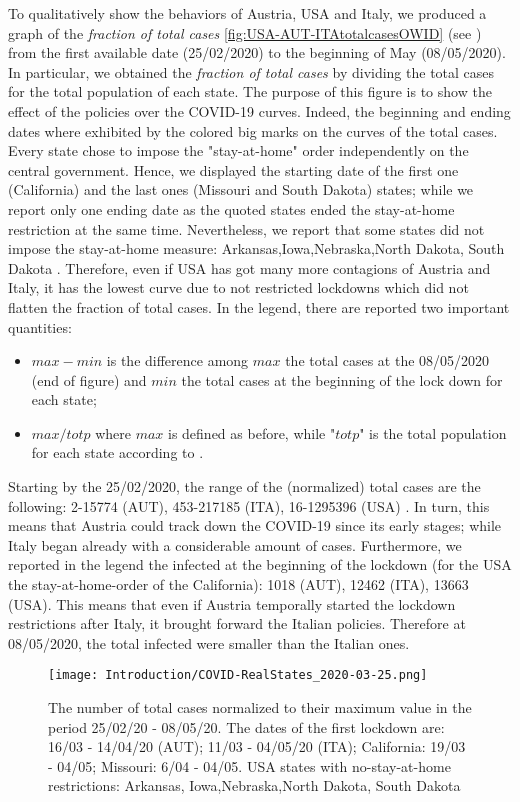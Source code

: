 \documentclass[a4paper,10pt]{book} %
\theoremstyle{definition}
\begin{document}
To qualitatively show the behaviors of Austria, USA and Italy, we produced a graph of the \textit{fraction of total cases}  \autoref{fig:USA-AUT-ITAtotalcasesOWID} (see \cite{JHUGitHub:2020_TotalCases}) from the first available date (25/02/2020) to the beginning of May (08/05/2020). In particular, we obtained the \textit{fraction of total cases} by dividing the total cases for the total population of each state.
The purpose of this figure is to show the effect of the policies over the COVID-19 curves.
Indeed, the beginning and ending dates where exhibited by the colored big marks on the curves of the total cases. Every state chose to impose the "stay-at-home" order independently on the central government. Hence, we displayed the starting date of the first one (California) and the last ones (Missouri and South Dakota) states; while we report only one ending date as the quoted states ended the stay-at-home restriction at the same time. Nevertheless, we report that some states did not impose the stay-at-home measure: Arkansas,Iowa,Nebraska,North Dakota,	South Dakota \cite{NBC_USA:2020_InitalDates}.
Therefore, even if USA has got many more contagions of Austria and Italy, it has the lowest curve due to not restricted lockdowns which did not flatten the fraction of total cases. 
In the legend, there are reported two important quantities:
\begin{itemize}
	\item $max - min$ is the difference among $max$ the total cases at the 08/05/2020 (end of figure) and $min$ the total cases at the beginning of the lock down for each state;
	\item $max / totp$ where $max$ is defined as before, while "$totp$" is the total population for each state according to \cite{PopulationEstimate}.
\end{itemize}
Starting by the 25/02/2020, the range of the (normalized) total cases are the following: 2-15774 (AUT), 453-217185 (ITA), 16-1295396 (USA) \cite{JHUGitHub:2020_TotalCases}. In turn, this means that Austria could track down the COVID-19 since its early stages; while Italy began already with a considerable amount of cases. Furthermore, we reported in the legend the infected at the beginning of the lockdown (for the USA the stay-at-home-order of the California): 1018 (AUT), 12462 (ITA), 13663 (USA). This means that even if Austria temporally started the lockdown restrictions after Italy, it brought forward the Italian policies. Therefore at 08/05/2020, the total infected were smaller than the Italian ones.
\begin{figure}[tbp]
	\centering
	\texttt{[image: Introduction/COVID-RealStates\_2020-03-25.png]}
	\caption{The number of total cases normalized to their maximum value in the period 25/02/20 - 08/05/20. The dates of the first lockdown are: 16/03 - 14/04/20 (AUT); 11/03 - 04/05/20 (ITA); California: 19/03 - 04/05; Missouri: 6/04 - 04/05. USA states with no-stay-at-home restrictions: Arkansas,	Iowa,Nebraska,North Dakota,	South Dakota}
	\label{fig:USA-AUT-ITAtotalcasesOWID}
\end{figure}
\end{document}
